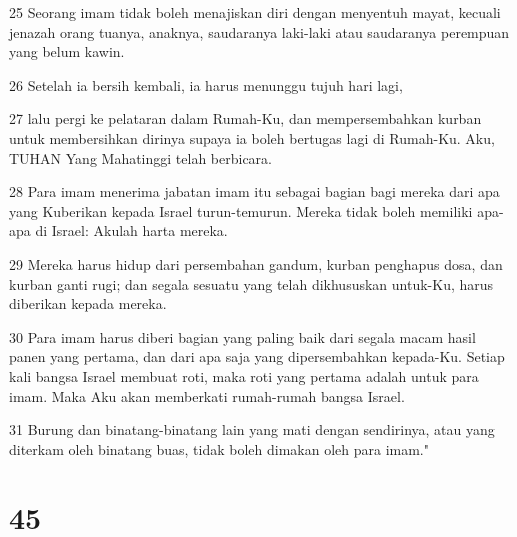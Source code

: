 \par 25 Seorang imam tidak boleh menajiskan diri dengan menyentuh mayat, kecuali jenazah orang tuanya, anaknya, saudaranya laki-laki atau saudaranya perempuan yang belum kawin.
\par 26 Setelah ia bersih kembali, ia harus menunggu tujuh hari lagi,
\par 27 lalu pergi ke pelataran dalam Rumah-Ku, dan mempersembahkan kurban untuk membersihkan dirinya supaya ia boleh bertugas lagi di Rumah-Ku. Aku, TUHAN Yang Mahatinggi telah berbicara.
\par 28 Para imam menerima jabatan imam itu sebagai bagian bagi mereka dari apa yang Kuberikan kepada Israel turun-temurun. Mereka tidak boleh memiliki apa-apa di Israel: Akulah harta mereka.
\par 29 Mereka harus hidup dari persembahan gandum, kurban penghapus dosa, dan kurban ganti rugi; dan segala sesuatu yang telah dikhususkan untuk-Ku, harus diberikan kepada mereka.
\par 30 Para imam harus diberi bagian yang paling baik dari segala macam hasil panen yang pertama, dan dari apa saja yang dipersembahkan kepada-Ku. Setiap kali bangsa Israel membuat roti, maka roti yang pertama adalah untuk para imam. Maka Aku akan memberkati rumah-rumah bangsa Israel.
\par 31 Burung dan binatang-binatang lain yang mati dengan sendirinya, atau yang diterkam oleh binatang buas, tidak boleh dimakan oleh para imam."

\chapter{45}

